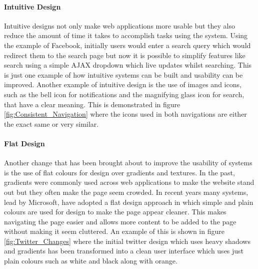 \paragraph{Intuitive Design} Intuitive designs not only make web applications more usable but they also reduce the amount of time it takes to accomplish tasks using the system. Using the example of Facebook, initially users would enter a search query which would redirect them to the search page but now it is possible to simplify features like search using a simple AJAX dropdown which live updates whilst searching. This is just one example of how intuitive systems can be built and usability can be improved. Another example of intuitive design is the use of images and icons, such as the bell icon for notifications and the magnifying glass icon for search, that have a clear meaning. This is demonstrated in figure \ref{fig:Consistent_Navigation} where the icons used in both navigations are either the exact same or very similar.

\paragraph{Flat Design} Another change that has been brought about to improve the usability of systems is the use of flat colours for design over gradients and textures. In the past, gradients were commonly used across web applications to make the website stand out but they often make the page seem crowded. In recent years many systems, lead by Microsoft, have adopted a flat design approach in which simple and plain colours are used for design to make the page appear cleaner. This makes navigating the page easier and allows more content to be added to the page without making it seem cluttered. An example of this is shown in figure \ref{fig:Twitter_Changes} where the initial twitter design which uses heavy shadows and gradients has been transformed into a clean user interface which uses just plain colours such as white and black along with orange.

